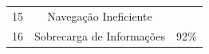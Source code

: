 \begin{table}[H]
\begin{tabular}{|l|c|l|l|l|l|l|}
		\multicolumn{1}{|c|}{15} & \multicolumn{5}{c|}{Navegação Ineficiente}                                                                 &                                                                                                                                                        \\ \cline{1-6}
		\multicolumn{1}{|c|}{16} & \multicolumn{5}{c|}{Sobrecarga de Informações}                                                             & \multirow{-16}{*}{92\%}                                                                                                                                \\ \hline
	\end{tabular}
\end{table}